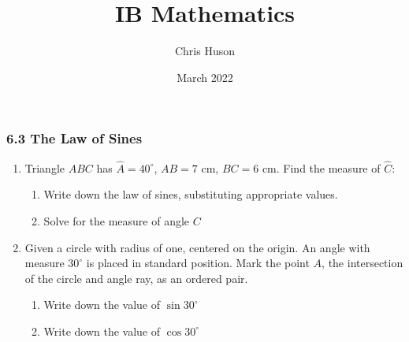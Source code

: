 \documentclass[12pt, twoside]{article}
\title{IB Mathematics}
\author{Chris Huson}
\date{March 2022}
\begin{document}
\subsubsection*{6.3 The Law of Sines}
\begin{enumerate}
\item Triangle $ABC$ has $\hat{A}=40^\circ$, $AB=7 \text{ cm}$, $BC=6 \text{ cm}$. Find the measure of $\hat{C}$:
  \begin{enumerate}
        \item Write down the law of sines, substituting appropriate values.\\[0.5in]
        \item Solve for the measure of angle $C$
  \end{enumerate}
  \begin{center}
  \end{center}

\newpage
\item Given a circle with radius of one, centered on the origin. An angle with measure $30^\circ$ is placed in standard position. Mark the point $A$, the intersection of the circle and angle ray, as an ordered pair.
    \begin{center}
    \end{center}
    \begin{enumerate}
          \item Write down the value of $\sin{30^\circ}$\\[0.25in]
          \item  Write down the value of $\cos{30^\circ}$\\[0.25in]
    \end{enumerate}
    
    
    

\end{enumerate}
\end{document}
